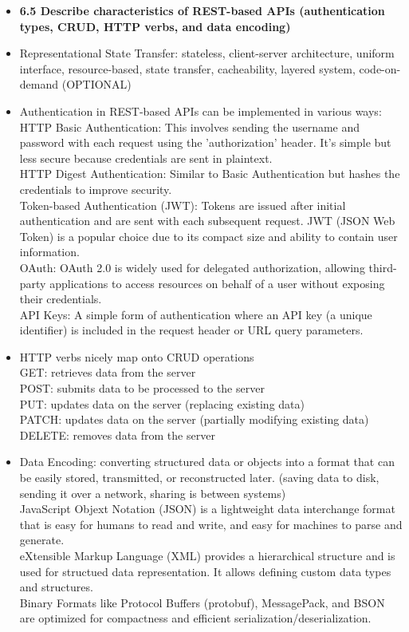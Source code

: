 \documentclass{article}
\begin{document}
\begin{itemize}
  \item \textbf{6.5 Describe characteristics of REST-based APIs (authentication types, CRUD, HTTP verbs, and data encoding)}
  	\item[] Representational State Transfer: stateless, client-server architecture, uniform interface, resource-based, state transfer, cacheability, layered system, code-on-demand (OPTIONAL)
  	\item[] Authentication in REST-based APIs can be implemented in various ways:\\
  		HTTP Basic Authentication: This involves sending the username and password with each request using the 'authorization' header. It's simple but less secure because credentials are sent in plaintext.\\
		HTTP Digest Authentication: Similar to Basic Authentication but hashes the credentials to improve security.\\
		Token-based Authentication (JWT): Tokens are issued after initial authentication and are sent with each subsequent request. JWT (JSON Web Token) is a popular choice due to its compact size and ability to contain user information.\\
		OAuth: OAuth 2.0 is widely used for delegated authorization, allowing third-party applications to access resources on behalf of a user without exposing their credentials.\\
		API Keys: A simple form of authentication where an API key (a unique identifier) is included in the request header or URL query parameters.
  	\item[] HTTP verbs nicely map onto CRUD operations\\
			GET: retrieves data from the server\\
			POST: submits data to be processed to the server\\
			PUT: updates data on the server (replacing existing data)\\
			PATCH: updates data on the server (partially modifying existing data)\\
			DELETE: removes data from the server
	\item[] Data Encoding: converting structured data or objects into a format that can be easily stored, transmitted, or reconstructed later. (saving data to disk, sending it over a network, sharing is between systems)\\
			JavaScript Objext Notation (JSON) is a lightweight data interchange format that is easy for humans to read and write, and easy for machines to parse and generate.\\
			eXtensible Markup Language (XML) provides a hierarchical structure and is used for structued data representation. It allows defining custom data types and structures.\\
			Binary Formats like Protocol Buffers (protobuf), MessagePack, and BSON are optimized for compactness and efficient serialization/deserialization.
  

\end{itemize}
\end{document}
